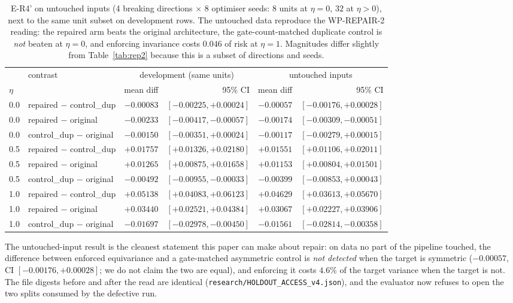\documentclass{neurips_2024}
\begin{document}
\begin{table}[t]
\centering
\caption{E-R4' on untouched inputs (4 breaking directions $\times$ $8$ optimiser seeds: $8$
units at $\eta{=}0$, $32$ at $\eta{>}0$), next to the same unit subset on development rows.
The untouched data reproduce the WP-REPAIR-2 reading: the repaired arm beats the original
architecture, the gate-count-matched duplicate control is \emph{not} beaten at $\eta{=}0$,
and enforcing invariance costs $0.046$ of risk at $\eta{=}1$. Magnitudes differ slightly from
Table~\ref{tab:rep2} because this is a subset of directions and seeds.}
\label{tab:er4}
\small
\begin{tabular}{@{}llrrrr@{}}
\toprule
& contrast & \multicolumn{2}{c}{development (same units)} & \multicolumn{2}{c}{untouched inputs} \\
\cmidrule(lr){3-4}\cmidrule(l){5-6}
$\eta$ & & mean diff & 95\% CI & mean diff & 95\% CI \\
\midrule
0.0 & repaired $-$ control\_dup & $-0.00083$ & $[-0.00225,+0.00024]$ & $-0.00057$ & $[-0.00176,+0.00028]$ \\
0.0 & repaired $-$ original & $\mathbf{-0.00233}$ & $[-0.00417,-0.00057]$ & $\mathbf{-0.00174}$ & $[-0.00309,-0.00051]$ \\
0.0 & control\_dup $-$ original & $-0.00150$ & $[-0.00351,+0.00024]$ & $-0.00117$ & $[-0.00279,+0.00015]$ \\
\midrule
0.5 & repaired $-$ control\_dup & $+0.01757$ & $[+0.01326,+0.02180]$ & $+0.01551$ & $[+0.01106,+0.02011]$ \\
0.5 & repaired $-$ original & $+0.01265$ & $[+0.00875,+0.01658]$ & $+0.01153$ & $[+0.00804,+0.01501]$ \\
0.5 & control\_dup $-$ original & $-0.00492$ & $[-0.00955,-0.00033]$ & $-0.00399$ & $[-0.00853,+0.00043]$ \\
\midrule
1.0 & repaired $-$ control\_dup & $+0.05138$ & $[+0.04083,+0.06123]$ & $\mathbf{+0.04629}$ & $[+0.03613,+0.05670]$ \\
1.0 & repaired $-$ original & $+0.03440$ & $[+0.02521,+0.04384]$ & $+0.03067$ & $[+0.02227,+0.03906]$ \\
1.0 & control\_dup $-$ original & $-0.01697$ & $[-0.02978,-0.00450]$ & $-0.01561$ & $[-0.02814,-0.00358]$ \\
\bottomrule
\end{tabular}
\end{table}

The untouched-input result is the cleanest statement this paper can make about repair: on data
no part of the pipeline touched, the difference between enforced equivariance and a
gate-matched asymmetric control is \emph{not detected} when the target is symmetric ($-0.00057$,
CI $[-0.00176,+0.00028]$; we do not claim the two are equal), and enforcing it costs $4.6\%$ of
the target variance when the target is not. The file digests before and after the read are identical
(\texttt{research/HOLDOUT\_ACCESS\_v4.json}), and the evaluator now refuses to open the two
splits consumed by the defective run.
\end{document}
